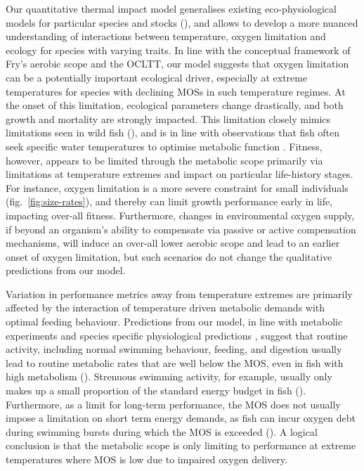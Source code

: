 \documentclass[11pt]{article}\usepackage[]{graphicx}\usepackage[]{color,soul}
\begin{document}
Our quantitative thermal impact model generalises existing eco-physiological models for particular species and stocks (\citealt{hufnagl_physiological_2011, holt_climate_2014,holt_climate_2015}), and allows to develop a more nuanced understanding of interactions between temperature, oxygen limitation and ecology for species with varying traits. In line with the conceptual framework of Fry's aerobic scope and the OCLTT, our model suggests that oxygen limitation can be a potentially important ecological driver, especially at extreme temperatures for species with declining MOSs in such temperature regimes. At the onset of this limitation, ecological parameters change drastically, and both growth and mortality are strongly impacted. This limitation closely mimics limitations seen in wild fish (\citealt{myrick_temperature_2000}), and is in line with observations that fish often seek specific water temperatures to optimise metabolic function \cite[e.g., ][]{armstrong_diel_2013,claireaux_physiology_1995}. Fitness, however, appears to be limited through the metabolic scope primarily via limitations at temperature extremes and impact on particular life-history stages. For instance, oxygen limitation is a more severe constraint for small individuals (fig.~\ref{fig:size-rates}), and thereby can limit growth performance early in life, impacting over-all fitness. Furthermore, changes in environmental oxygen supply, if beyond an organism's ability to compensate via passive or active compensation mechanisms, will induce an over-all lower aerobic scope and lead to an earlier onset of oxygen limitation, but such scenarios do not change the qualitative predictions from our model.

Variation in performance metrics away from temperature extremes are primarily affected by the interaction of temperature driven metabolic demands with optimal feeding behaviour. Predictions from our model, in line with metabolic experiments and species specific physiological predictions \cite[e.g., ][]{holt_climate_2014}, suggest that routine activity, including normal swimming behaviour, feeding, and digestion usually lead to routine metabolic rates that are well below the MOS, even in fish with high metabolism (\citealt{lucas_utilization_1992,priede_metabolic_1985}). Strenuous swimming activity, for example, usually only makes up a small proportion of the standard energy budget in fish (\citealt{priede_natural_1977,priede_metabolic_1985}). Furthermore, as a limit for long-term performance, the MOS does not usually impose a limitation on short term energy demands, as fish can incur oxygen debt during swimming bursts during which the MOS is exceeded (\citealt{brett_metabolic_1972,priede_metabolic_1985}). A logical conclusion is that the metabolic scope is only limiting to performance at extreme temperatures where MOS is low due to impaired oxygen delivery.
\end{document}
